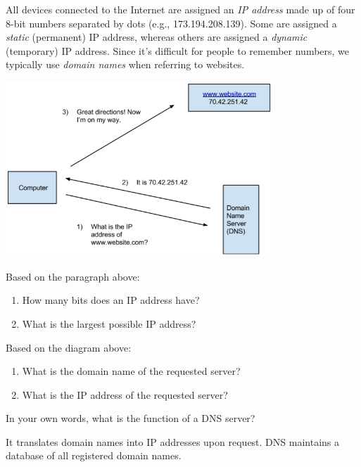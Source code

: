 

All devices connected to the Internet are assigned an \emph{IP address} made up of four 8-bit numbers separated by dots (e.g., 173.194.208.139). Some are assigned a \emph{static} (permanent) IP address, whereas others are assigned a \emph{dynamic} (temporary) IP address. Since it's difficult for people to remember numbers, we typically use \emph{domain names} when referring to websites.

\begin{center}
\includegraphics[width=0.75\textwidth]{dns1.png}
\end{center}




\Q Based on the paragraph above:
\begin{enumerate}
\item How many bits does an IP address have? 
\item What is the largest possible IP address? 
\end{enumerate}


\Q Based on the diagram above:
\begin{enumerate}
\item What is the domain name of the requested server? 
\item What is the IP address of the requested server? 
\end{enumerate}


\Q In your own words, what is the function of a DNS server?

\begin{answer}
It translates domain names into IP addresses upon request.
DNS maintains a database of all registered domain names.
\end{answer}



